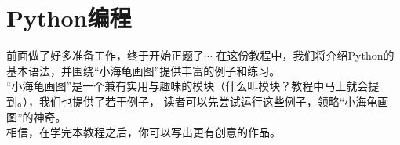 \part{Python编程}
前面做了好多准备工作，终于开始正题了$\cdots$
在这份教程中，我们将介绍Python的基本语法，并围绕“小海龟画图”提供丰富的例子和练习。\\
“小海龟画图”是一个兼有实用与趣味的模块（什么叫模块？教程中马上就会提到。），我们也提供了若干例子，
读者可以先尝试运行这些例子，领略“小海龟画图”的神奇。\\
相信，在学完本教程之后，你可以写出更有创意的作品。

